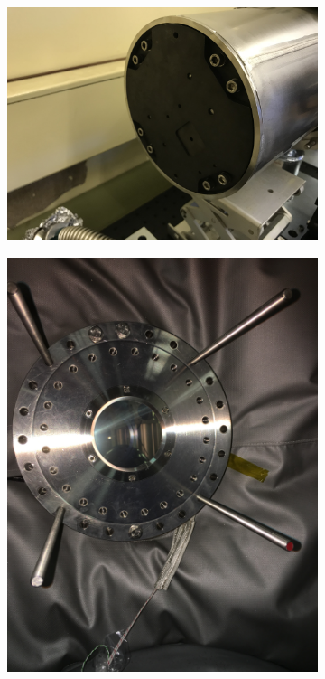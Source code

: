          
\begin{figure}
     \begin{subfigure}{0.49\linewidth}
         \centering
         \includegraphics[trim={1500 500 0 0},clip,width=\textwidth]{Chapters/chapter2/figs/2018-07-23 11.25.01.jpg}
         \caption{}
         \label{fig:IRVB4}
     \end{subfigure}
     \begin{subfigure}{0.49\linewidth}
         \centering
         \includegraphics[trim={500 0 1000 500},clip,width=\textwidth]{Chapters/chapter2/figs/IMG_7199.JPG}

\end{subfigure}
\end{figure}
